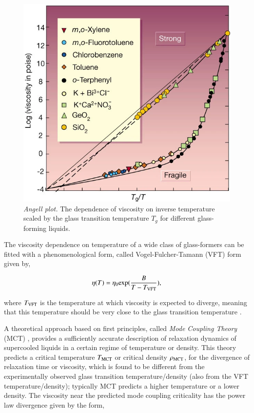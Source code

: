     \begin{figure}[hbt!]
	\includegraphics[width=12cm]{figs/fig_angell.png}
	\centering
	\caption[{\em Angell plot}]{{\em Angell plot.} The dependence of viscosity on inverse temperature scaled by the glass transition temperature $T_g$ for different glass-forming liquids.\cite{debenedetti2001supercooled}\label{fig_angell}}
    \end{figure}
    
The viscosity dependence on temperature of a wide class of glass-formers can be fitted with a phenomenological form, called Vogel-Fulcher-Tamann (VFT) form given by,

    \begin{equation}
        \eta(T) = \eta_{0}{\rm exp}(\frac{B}{T-T_{\rm VFT}}),
    \end{equation}
    
where $T_{\rm VFT}$ is the temperature at which viscosity is expected to diverge, meaning that this temperature should be very close to the glass transition temperature \cite{fulcher1992analysis,tammann1926abhangigkeit}.

A theoretical approach based on first principles, called {\em Mode Coupling Theory} (MCT) \cite{bengtzelius1984dynamics,reichman2005mode}, provides a sufficiently accurate description of relaxation dynamics of supercooled liquids in a certain regime of temperature or density. This theory predicts a critical temperature $T_{\rm MCT}$ or critical density $\rho_{\rm MCT}$, for the divergence of relaxation time or viscosity, which is found to be different from the experimentally observed glass transition temperature/density (also from the VFT temperature/density); typically MCT predicts a higher temperature or a lower density. The viscosity near the predicted mode coupling criticality has the power law divergence given by the form,

